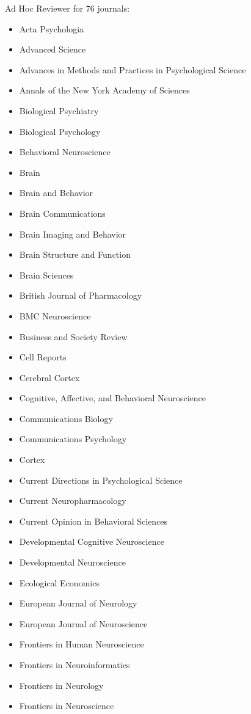 \documentclass[11pt, letterpaper]{article}
\begin{document}
Ad Hoc Reviewer for 76 journals:
\begin{multicols}{2}
\begin{itemize}[noitemsep]
\itshape
\item Acta Psychologia
\item Advanced Science
\item Advances in Methods and Practices in Psychological Science
\item Annals of the New York Academy of Sciences
\item Biological Psychiatry
\item Biological Psychology
\item Behavioral Neuroscience
\item Brain
\item Brain and Behavior
\item Brain Communications
\item Brain Imaging and Behavior
\item Brain Structure and Function
\item Brain Sciences
\item British Journal of Pharmacology
\item BMC Neuroscience 
\item Business and Society Review
\item Cell Reports
\item Cerebral Cortex 
\item Cognitive, Affective, and Behavioral Neuroscience 
\item Communications Biology
\item Communications Psychology
\item Cortex
\item Current Directions in Psychological Science
\item Current Neuropharmacology
\item Current Opinion in Behavioral Sciences
\item Developmental Cognitive Neuroscience 
\item Developmental Neuroscience 
\item Ecological Economics
\item European Journal of Neurology
\item European Journal of Neuroscience
\item Frontiers in Human Neuroscience 
\item Frontiers in Neuroinformatics 
\item Frontiers in Neurology 
\item Frontiers in Neuroscience 

\end{itemize}
\end{multicols}
\end{document}
